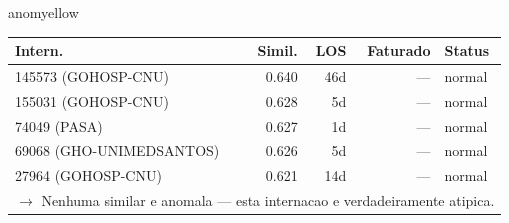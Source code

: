 \documentclass[a4paper,10pt]{article}
\begin{document}
\begin{anomalycard}[Internacao 163334 | GHO-PETROBRAS | MODERADO (z=2.03)]{anomyellow}
\begin{tabular}{l r r r l}\toprule\textbf{Intern.} & \textbf{Simil.} & \textbf{LOS} & \textbf{Faturado} & \textbf{Status} \\\midrule
145573 (GOHOSP-CNU) & 0.640 & 46d & --- & \textcolor{jcubeblue}{normal} \\
155031 (GOHOSP-CNU) & 0.628 & 5d & --- & \textcolor{jcubeblue}{normal} \\
74049 (PASA) & 0.627 & 1d & --- & \textcolor{jcubeblue}{normal} \\
69068 (GHO-UNIMEDSANTOS) & 0.626 & 5d & --- & \textcolor{jcubeblue}{normal} \\
27964 (GOHOSP-CNU) & 0.621 & 14d & --- & \textcolor{jcubeblue}{normal} \\
\multicolumn{5}{l}{\textcolor{jcubeblue}{\small $\rightarrow$ Nenhuma similar e anomala --- esta internacao e verdadeiramente atipica.}} \\
\bottomrule\end{tabular}


\end{anomalycard}

\newpage
\end{document}
